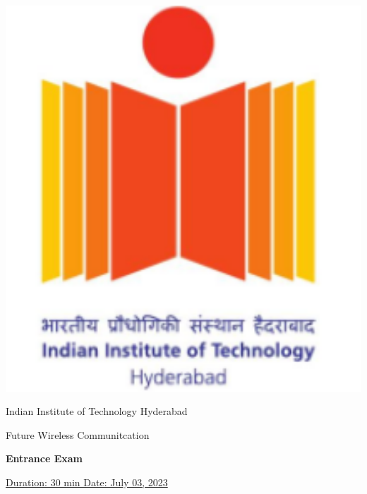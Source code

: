 \documentclass[11pt, a4paper]{exam}
\begin{document}
	\noindent
	\begin{minipage}[l]{0.1\textwidth}
		\noindent
		\includegraphics[width=1.6\textwidth]{figs/logo.png}
	\end{minipage}
\hfill
\begin{minipage}[c]{0.8\textwidth}
	\begin{center}
		\large	Indian Institute of Technology Hyderabad \par
		\large	Future Wireless Communitcation \par
	\large \textbf{Entrance Exam}%
	\end{center}
\end{minipage}
\par
\vspace{0.2in}
\noindent
\uline{Duration: 30 min \hfill Date: July 03, 2023}%
\par 
\vspace{0.15in}
\noindent
\centering
\end{document}
